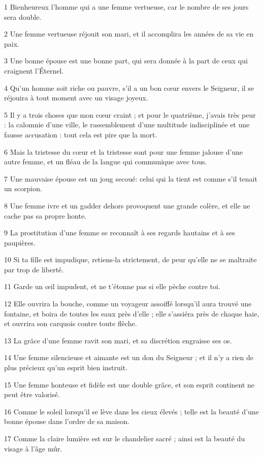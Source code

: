 \par 1 Bienheureux l'homme qui a une femme vertueuse, car le nombre de ses jours sera double.
\par 2 Une femme vertueuse réjouit son mari, et il accomplira les années de sa vie en paix.
\par 3 Une bonne épouse est une bonne part, qui sera donnée à la part de ceux qui craignent l'Éternel.
\par 4 Qu'un homme soit riche ou pauvre, s'il a un bon cœur envers le Seigneur, il se réjouira à tout moment avec un visage joyeux.
\par 5 Il y a trois choses que mon cœur craint ; et pour le quatrième, j'avais très peur : la calomnie d'une ville, le rassemblement d'une multitude indisciplinée et une fausse accusation : tout cela est pire que la mort.
\par 6 Mais la tristesse du cœur et la tristesse sont pour une femme jalouse d'une autre femme, et un fléau de la langue qui communique avec tous.
\par 7 Une mauvaise épouse est un joug secoué: celui qui la tient est comme s'il tenait un scorpion.
\par 8 Une femme ivre et un gadder dehors provoquent une grande colère, et elle ne cache pas sa propre honte.
\par 9 La prostitution d'une femme se reconnaît à ses regards hautains et à ses paupières.
\par 10 Si ta fille est impudique, retiens-la strictement, de peur qu'elle ne se maltraite par trop de liberté.
\par 11 Garde un œil impudent, et ne t'étonne pas si elle pèche contre toi.
\par 12 Elle ouvrira la bouche, comme un voyageur assoiffé lorsqu'il aura trouvé une fontaine, et boira de toutes les eaux près d'elle ; elle s'assiéra près de chaque haie, et ouvrira son carquois contre toute flèche.
\par 13 La grâce d'une femme ravit son mari, et sa discrétion engraisse ses os.
\par 14 Une femme silencieuse et aimante est un don du Seigneur ; et il n’y a rien de plus précieux qu’un esprit bien instruit.
\par 15 Une femme honteuse et fidèle est une double grâce, et son esprit continent ne peut être valorisé.
\par 16 Comme le soleil lorsqu'il se lève dans les cieux élevés ; telle est la beauté d'une bonne épouse dans l'ordre de sa maison.
\par 17 Comme la claire lumière est sur le chandelier sacré ; ainsi est la beauté du visage à l’âge mûr.
